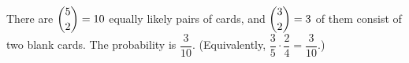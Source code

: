 There are $\dbinom52=10$ equally likely pairs of cards, and $\dbinom32=3$ of them consist of two blank cards. The probability is $\boxed{\dfrac{3}{10}}$. (Equivalently, $\dfrac35\cdot\dfrac24=\dfrac{3}{10}$.)
